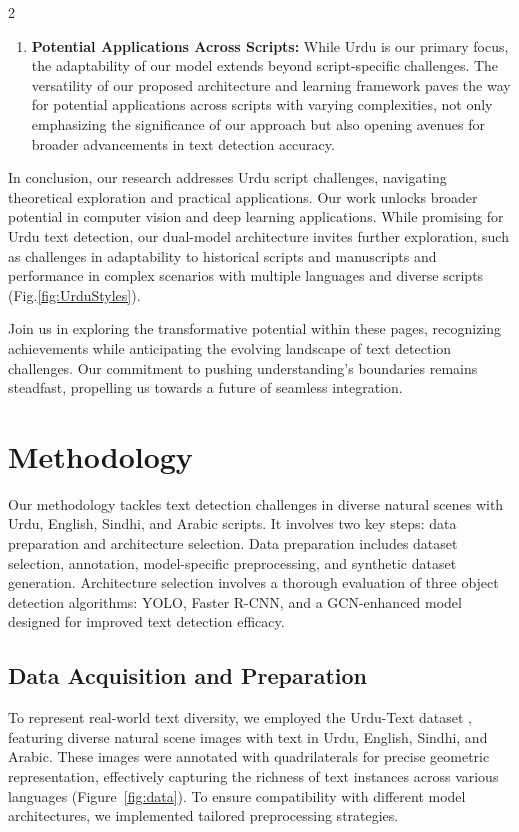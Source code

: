 \documentclass[sn-mathphys,Numbered]{sn-jnl}%
\begin{document}
\begin{multicols}{2}
\begin{enumerate}
	\item \textbf{Potential Applications Across Scripts:} While Urdu is our primary focus, the adaptability of our model extends beyond script-specific challenges. The versatility of our proposed architecture and learning framework paves the way for potential applications across scripts with varying complexities, not only emphasizing the significance of our approach but also opening avenues for broader advancements in text detection accuracy.
\end{enumerate}

In conclusion, our research addresses Urdu script challenges, navigating theoretical exploration and practical applications. Our work unlocks broader potential in computer vision and deep learning applications. While promising for Urdu text detection, our dual-model architecture invites further exploration, such as challenges in adaptability to historical scripts and manuscripts and performance in complex scenarios with multiple languages and diverse scripts (Fig.\ref{fig:UrduStyles}).

Join us in exploring the transformative potential within these pages, recognizing achievements while anticipating the evolving landscape of text detection challenges. Our commitment to pushing understanding's boundaries remains steadfast, propelling us towards a future of seamless integration.

\section{Methodology}
Our methodology tackles text detection challenges in diverse natural scenes with Urdu, English, Sindhi, and Arabic scripts. It involves two key steps: data preparation and architecture selection. Data preparation includes dataset selection, annotation, model-specific preprocessing, and synthetic dataset generation. Architecture selection involves a thorough evaluation of three object detection algorithms: YOLO, Faster R-CNN, and a GCN-enhanced model designed for improved text detection efficacy.

\subsection{Data Acquisition and Preparation}
To represent real-world text diversity, we employed the Urdu-Text dataset \cite{urcutext}, featuring diverse natural scene images with text in Urdu, English, Sindhi, and Arabic. These images were annotated with quadrilaterals for precise geometric representation, effectively capturing the richness of text instances across various languages (Figure~\ref{fig:data}). To ensure compatibility with different model architectures, we implemented tailored preprocessing strategies.


\end{multicols}
\end{document}
